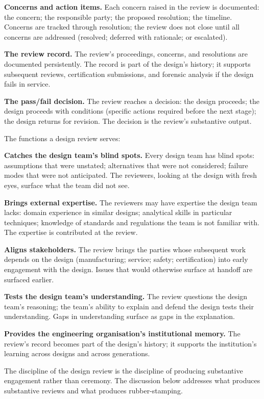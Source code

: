 \textbf{Concerns and action items.} Each concern raised in the review is documented: the concern; the responsible party; the proposed resolution; the timeline. Concerns are tracked through resolution; the review does not close until all concerns are addressed (resolved; deferred with rationale; or escalated).

\textbf{The review record.} The review's proceedings, concerns, and resolutions are documented persistently. The record is part of the design's history; it supports subsequent reviews, certification submissions, and forensic analysis if the design fails in service.

\textbf{The pass/fail decision.} The review reaches a decision: the design proceeds; the design proceeds with conditions (specific actions required before the next stage); the design returns for revision. The decision is the review's substantive output.

The functions a design review serves:

\textbf{Catches the design team's blind spots.} Every design team has blind spots: assumptions that were unstated; alternatives that were not considered; failure modes that were not anticipated. The reviewers, looking at the design with fresh eyes, surface what the team did not see.

\textbf{Brings external expertise.} The reviewers may have expertise the design team lacks: domain experience in similar designs; analytical skills in particular techniques; knowledge of standards and regulations the team is not familiar with. The expertise is contributed at the review.

\textbf{Aligns stakeholders.} The review brings the parties whose subsequent work depends on the design (manufacturing; service; safety; certification) into early engagement with the design. Issues that would otherwise surface at handoff are surfaced earlier.

\textbf{Tests the design team's understanding.} The review questions the design team's reasoning; the team's ability to explain and defend the design tests their understanding. Gaps in understanding surface as gaps in the explanation.

\textbf{Provides the engineering organisation's institutional memory.} The review's record becomes part of the design's history; it supports the institution's learning across designs and across generations.

The discipline of the design review is the discipline of producing substantive engagement rather than ceremony. The discussion below addresses what produces substantive reviews and what produces rubber-stamping.

